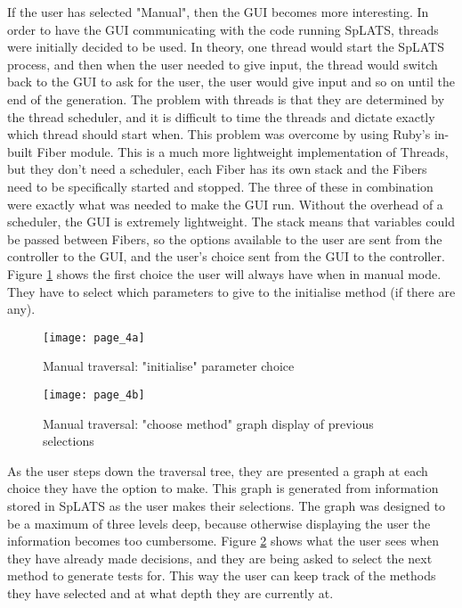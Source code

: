   If the user has selected "Manual", then the GUI becomes more interesting. In order to have the GUI communicating with the code running SpLATS, threads were initially decided to be used. In theory, one thread would start the SpLATS process, and then when the user needed to give input, the thread would switch back to the GUI to ask for the user, the user would give input and so on until the end of the generation. The problem with threads is that they are determined by the thread scheduler, and it is difficult to time the threads and dictate exactly which thread should start when. This problem was overcome by using Ruby's in-built Fiber module. This is a much more lightweight implementation of Threads, but they don't need a scheduler, each Fiber has its own stack and the Fibers need to be specifically started and stopped. The three of these in combination were exactly what was needed to make the GUI run. Without the overhead of a scheduler, the GUI is extremely lightweight. The stack means that variables could be passed between Fibers, so the options available to the user are sent from the controller to the GUI, and the user's choice sent from the GUI to the controller. Figure \ref{fig:GUI_Page4a} shows the first choice the user will always have when in manual mode. They have to select which parameters to give to the initialise method (if there are any).
  
  \begin{figure}
    \centering
    \texttt{[image: page\_4a]}
    \caption{Manual traversal: "initialise" parameter choice}
    \label{fig:GUI_Page4a}
  \end{figure}
  
  \begin{figure}
    \centering
    \texttt{[image: page\_4b]}
    \caption{Manual traversal: "choose method" graph display of previous selections}
    \label{fig:GUI_Page4b}
  \end{figure}
  
  As the user steps down the traversal tree, they are presented a graph at each choice they have the option to make. This graph is generated from information stored in SpLATS as the user makes their selections. The graph was designed to be a maximum of three levels deep, because otherwise displaying the user the information becomes too cumbersome. Figure \ref{fig:GUI_Page4b} shows what the user sees when they have already made decisions, and they are being asked to select the next method to generate tests for. This way the user can keep track of the methods they have selected and at what depth they are currently at.

